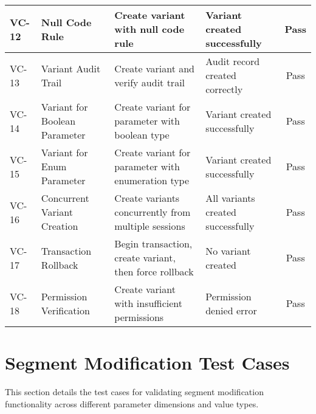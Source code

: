 \begin{longtable}{|p{0.7cm}|p{3.5cm}|p{3.7cm}|p{3.7cm}|c|}
\hline
VC-12 & Null Code Rule & Create variant with null code rule & Variant created successfully & Pass \\
\hline
VC-13 & Variant Audit Trail & Create variant and verify audit trail & Audit record created correctly & Pass \\
\hline
VC-14 & Variant for Boolean Parameter & Create variant for parameter with boolean type & Variant created successfully & Pass \\
\hline
VC-15 & Variant for Enum Parameter & Create variant for parameter with enumeration type & Variant created successfully & Pass \\
\hline
VC-16 & Concurrent Variant Creation & Create variants concurrently from multiple sessions & All variants created successfully & Pass \\
\hline
VC-17 & Transaction Rollback & Begin transaction, create variant, then force rollback & No variant created & Pass \\
\hline
VC-18 & Permission Verification & Create variant with insufficient permissions & Permission denied error & Pass \\
\hline
\end{longtable}

\section{Segment Modification Test Cases}
\label{sec:segment-modification-tests}

This section details the test cases for validating segment modification functionality across different parameter dimensions and value types.

